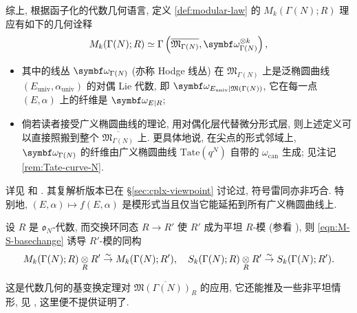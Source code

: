 综上, 根据函子化的代数几何语言, 定义 \ref{def:modular-law} 的 $M_k(\Gamma(N); R)$ 理应有如下的几何诠释
\begin{equation}\label{eqn:modular-law-as-section}
	M_k(\Gamma(N); R) \simeq \Gamma\left(\overline{\mathfrak{M}_{\Gamma(N)}}, \bomega_{\Gamma(N)}^{\otimes k} \right),
\end{equation}
\begin{itemize}
	\item 其中的线丛 $\bomega_{\Gamma(N)}$ (亦称 Hodge 线丛) 在 $\mathfrak{M}_{\Gamma(N)}$ 上是泛椭圆曲线 $(E_{\mathrm{univ}}, \alpha_{\mathrm{univ}})$ 的对偶 Lie 代数, 即 $\bomega_{E_{\mathrm{univ}}| \mathfrak{M}(\Gamma(N))}$, 它在每一点 $(E, \alpha)$ 上的纤维是 $\bomega_{E|R}$;
	\item 倘若读者接受广义椭圆曲线的理论, 用对偶化层代替微分形式层, 则上述定义可以直接照搬到整个 $\overline{\mathfrak{M}_{\Gamma(N)}}$ 上. 更具体地说, 在尖点的形式邻域上, $\bomega_{\Gamma(N)}$ 的纤维由广义椭圆曲线 $\mathrm{Tate}\left(q^N\right)$ 自带的 $\omega_{\mathrm{can}}$ 生成; 见注记 \ref{rem:Tate-curve-N}.
\end{itemize}
详见 \cite[\S\S 1.4---1.5]{Ka73} 和 \cite[\S\S 8.6---8.11]{KM85}. 其复解析版本已在 \S\ref{sec:cplx-viewpoint} 讨论过, 符号雷同亦非巧合. 特别地, $(E, \alpha) \mapsto f(E, \alpha)$ 是模形式当且仅当它能延拓到所有广义椭圆曲线上.

\begin{proposition}\label{prop:modular-basechange}
	设 $R$ 是 $\mathfrak{o}_N$-代数, 而交换环同态 $R \to R'$ 使 $R'$ 成为平坦 $R$-模 (参看 \cite[\S 6.9]{Li1}), 则 \eqref{eqn:M-S-basechange} 诱导 $R'$-模的同构
	\[ M_k(\Gamma(N); R) \underset{R}{\otimes} R' \stackrel{\sim}{\rightarrow} M_k(\Gamma(N); R'), \quad S_k(\Gamma(N); R) \underset{R}{\otimes} R' \stackrel{\sim}{\rightarrow} S_k(\Gamma(N); R'). \]
\end{proposition}
这是代数几何的基变换定理对 $\overline{\mathfrak{M}(\Gamma(N))_R}$ 的应用, 它还能推及一些非平坦情形, 见 \cite[\S\S 1.7---1.8]{Ka73}, 这里便不提供证明了.


